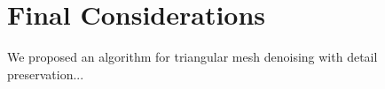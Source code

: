 \chapter{Final Considerations}
\label{cha:Final Considerations}

We proposed an algorithm for triangular mesh denoising with detail preservation...

